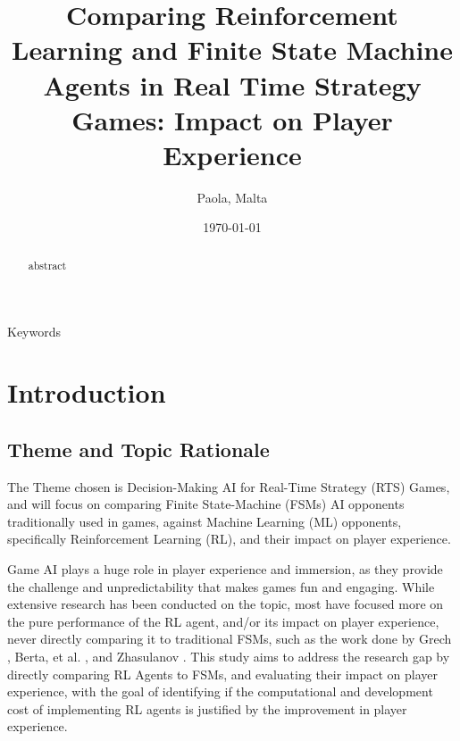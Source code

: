 \documentclass[conference]{IEEEtran}
\begin{document}
\title{Comparing Reinforcement Learning and Finite State Machine Agents in Real Time Strategy Games: Impact on Player Experience}

\author{
Paola, Malta
}

\date{\today}

\maketitle

\begin{abstract}
abstract
\end{abstract}

\begin{IEEEkeywords}
Keywords
\end{IEEEkeywords}

\section{Introduction}


\subsection{Theme and Topic Rationale}

The Theme chosen is Decision-Making AI for Real-Time Strategy (RTS) Games, and will focus on comparing Finite State-Machine (FSMs) AI opponents traditionally used in games, against Machine Learning (ML) opponents, specifically 
Reinforcement Learning (RL), and their impact on player experience. 

Game AI plays a huge role in player experience and immersion, as they provide the challenge and unpredictability that makes games fun and engaging.
While extensive research has been conducted on the topic, most have focused more on the pure performance of the RL agent, and/or its impact on player experience, never directly
comparing it to traditional FSMs, such as the work done by Grech \cite{grech_creating_2023}, Berta, et al. \cite{bin_ramlan_implementation_2021}, and Zhasulanov \cite{zhasulanov_enhancing_2024}.
This study aims to address the research gap by directly comparing RL Agents to FSMs, and evaluating their impact on player experience, with the goal of identifying if the computational
and development cost of implementing RL agents is justified by the improvement in player experience.
\end{document}
